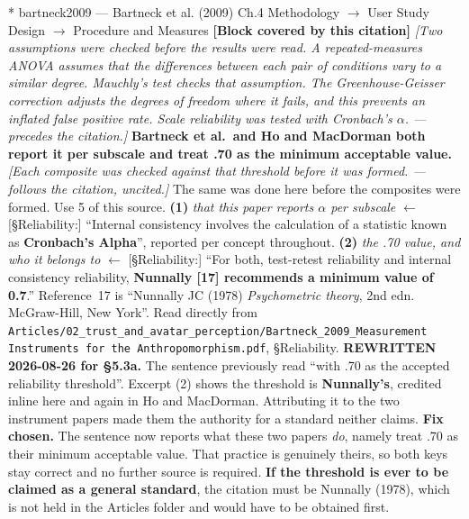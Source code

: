 \documentclass[11pt, a4paper]{article}
\makeatletter
\newcounter{citentry}
\newcommand{\citentry@core}[7]{%
  \stepcounter{citentry}
  \begingroup
  \sbox{\citentry@measurebox}{%
    \begin{minipage}{\linewidth}
      \noindent\colorbox{konstanzblue}{\parbox{\dimexpr\linewidth-2\fboxsep}{%
        \vspace{3pt}
        \textbf{\#\thecitentry \quad #2} \hfill \textit{#3}
        \vspace{3pt}
      }}
      \vspace{3pt}
      \noindent\begin{tabular}{@{}p{2.7cm} p{\dimexpr\linewidth-3cm}@{}}
        \textit{\small Sentence in thesis:} & #4 \\[5pt]
        \textbf{Usage:}\hfill       & #5 \\[5pt]
        \textit{\small Original source:}     & #6 \\[5pt]
        \textbf{How to check:}             & #7 \\
      \end{tabular}
      \vspace{5pt}
      \rule{10pt}{10pt}\quad \textbf{Validated} --- I have read the original and agree it supports the sentence.
    \end{minipage}%
  }%
  \Needspace{\dimexpr\ht\citentry@measurebox+\dp\citentry@measurebox\relax}%
  \endgroup
  \vspace{10pt}
  \noindent\colorbox{konstanzblue}{\parbox{\dimexpr\linewidth-2\fboxsep}{%
    \vspace{3pt}
    \textcolor{white}{\textbf{\#\thecitentry \quad #2}} \hfill \textcolor{white}{\textit{#3}}
    \vspace{3pt}
  }}
  \vspace{3pt}
  \noindent\begin{tabular}{@{}p{2.7cm} p{\dimexpr\linewidth-3cm}@{}}
    \textit{\small Sentence in thesis:} & \textcolor{darkgreen}{#4} \\[5pt]
    \textbf{Usage:}\hfill       & #5 \\[5pt]
    \textit{\small Original source:}     & \textcolor{darkred}{#6} \\[5pt]
    \textbf{How to check:}             & #7 \\
  \end{tabular}
  \vspace{5pt}
  \noindent\CheckBox[name=verified\thecitentry, width=10pt, height=10pt, bordercolor={0 0 0}, borderwidth=0.75, backgroundcolor={1 1 1}#1]{}\quad \textbf{Validated} --- I have read the original and agree it supports the sentence.
  \vspace{3pt}
  \noindent\textcolor{midgray}{\rule{\linewidth}{0.4pt}}
}
\newcommand{\citentry}{\@ifstar{\citentry@core{, checked}}{\citentry@core{}}}
\makeatother
\begin{document}
\begin{Form}
\citentry*
  {bartneck2009 --- Bartneck et al. (2009)}
  {Ch.4 Methodology $\rightarrow$ User Study Design $\rightarrow$ Procedure and Measures}
  {\textbf{[Block covered by this citation]} \emph{[Two assumptions were checked before the results were read. A repeated-measures ANOVA assumes that the differences between each pair of conditions vary to a similar degree. Mauchly's test checks that assumption. The Greenhouse-Geisser correction adjusts the degrees of freedom where it fails, and this prevents an inflated false positive rate. Scale reliability was tested with Cronbach's $\alpha$. --- precedes the citation.]} \textbf{Bartneck et al.\ and Ho and MacDorman both report it per subscale and treat .70 as the minimum acceptable value.} \emph{[Each composite was checked against that threshold before it was formed. --- follows the citation, uncited.]} The same was done here before the composites were formed.}
  {Use 5 of this source.}
  {\textbf{(1)} \emph{that this paper reports $\alpha$ per subscale} $\leftarrow$ [\S Reliability:] ``Internal consistency involves the calculation of a statistic known as \textbf{Cronbach's Alpha}'', reported per concept throughout. \quad \textbf{(2)} \emph{the .70 value, and who it belongs to} $\leftarrow$ [\S Reliability:] ``For both, test-retest reliability and internal consistency reliability, \textbf{Nunnally [17] recommends a minimum value of 0.7}.'' Reference~17 is ``Nunnally JC (1978) \emph{Psychometric theory}, 2nd edn. McGraw-Hill, New York''.}
  {Read directly from \texttt{\footnotesize Articles/02\_trust\_and\_avatar\_perception/Bartneck\_2009\_Measurement Instruments for the Anthropomorphism.pdf}, \S Reliability. \textbf{REWRITTEN 2026-08-26 for \S5.3a.} The sentence previously read ``with .70 as the accepted reliability threshold''. Excerpt (2) shows the threshold is \textbf{Nunnally's}, credited inline here and again in Ho and MacDorman. Attributing it to the two instrument papers made them the authority for a standard neither claims. \textbf{Fix chosen.} The sentence now reports what these two papers \emph{do}, namely treat .70 as their minimum acceptable value. That practice is genuinely theirs, so both keys stay correct and no further source is required. \textbf{If the threshold is ever to be claimed as a general standard}, the citation must be Nunnally (1978), which is not held in the Articles folder and would have to be obtained first.}


\end{Form}
\end{document}
